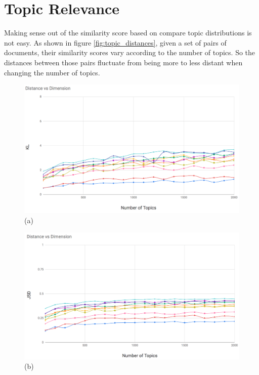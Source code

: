 \section{Topic Relevance}\label{ch:soa_topics}

Making sense out of the similarity score based on compare topic distributions is not easy. As shown in figure \ref{fig:topic_distances}, given a set of pairs of documents, their similarity scores vary according to the number of topics. So the distances between those pairs fluctuate from being more to less distant when changing the number of topics.
\begin{figure}
\begin{center}
\begin{adjustbox}{minipage=0.45\linewidth,frame=0pt 3pt}
\includegraphics[width=\linewidth]{KL_100_2k.png}
\centering (a)
\end{adjustbox}
\hfill
\begin{adjustbox}{minipage=0.45\linewidth,frame=0pt 3pt}
\includegraphics[width=\linewidth]{JSD_100_2k.png}
\centering (b)

\end{adjustbox}
\end{center}
\end{figure}
